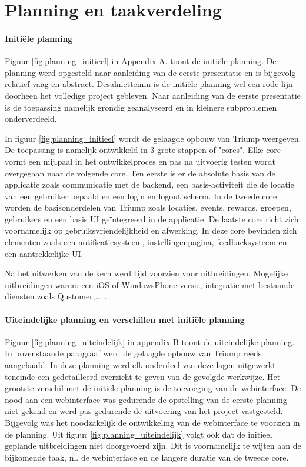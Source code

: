 
\chapter{Planning en taakverdeling}


\subsubsection{Initiële planning}

Figuur \ref{fig:planning_initieel} in Appendix A. toont de initiële planning. De planning werd opgesteld naar aanleiding van de eerste presentatie en is bijgevolg relatief vaag en abstract. Desalniettemin is de initiële planning wel een rode lijn doorheen het volledige project gebleven. Naar aanleiding van de eerste presentatie is de toepassing namelijk grondig geanalyseerd en in kleinere subproblemen onderverdeeld.

In figuur \ref{fig:planning_initieel} wordt de gelaagde opbouw van Triump weergeven. De toepassing is namelijk ontwikkeld in 3 grote stappen of "cores". Elke core vormt een mijlpaal in het ontwikkelproces en pas na uitvoerig testen wordt overgegaan naar de volgende core. 
Ten eerste is er de absolute basis van de applicatie zoals communicatie met de backend, een basis-activiteit die de locatie van een gebruiker bepaald en een login en logout scherm. In de tweede core worden de basisonderdelen van Triump zoals locaties, events, rewards, groepen, gebruikers en een basis UI geïntegreerd in de applicatie. De laatste core richt zich voornamelijk op gebruiksvriendelijkheid en afwerking. In deze core bevinden zich elementen zoals een notificatiesysteem, instellingenpagina, feedbacksysteem en een aantrekkelijke UI.

Na het uitwerken van de kern werd tijd voorzien voor uitbreidingen. Mogelijke uitbreidingen waren: een iOS of WindowsPhone versie, integratie met bestaande diensten zoals Qustomer,... . 

\subsubsection{Uiteindelijke planning en verschillen met initiële planning}

Figuur \ref{fig:planning_uiteindelijk} in appendix B toont de uiteindelijke planning. In bovenstaande paragraaf werd de gelaagde opbouw van Triump reeds aangehaald. In deze planning werd elk onderdeel van deze lagen uitgewerkt teneinde een gedetailleerd overzicht te geven van de gevolgde werkwijze. Het grootste verschil met de initiële planning is de toevoeging van de webinterface. De nood aan een webinterface was gedurende de opstelling van de eerste planning niet gekend en werd pas gedurende de uitvoering van het project vastgesteld. Bijgevolg was het noodzakelijk de ontwikkeling van de webinterface te voorzien in de planning. 
Uit figuur \ref{fig:planning_uiteindelijk} volgt ook dat de initieel geplande uitbreidingen niet doorgevoerd zijn. Dit is voornamelijk te wijten aan de bijkomende taak, nl. de webinterface en de langere duratie van de tweede core.

